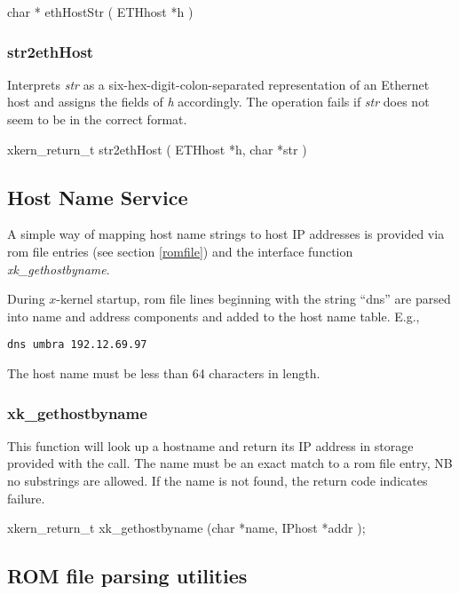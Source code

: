{\sem char *} {\bold ethHostStr} ( {\sem ETHhost} *{\caps h} )


\subsubsection{str2ethHost}

Interprets {\em str} as a six-hex-digit-colon-separated 
representation of an Ethernet host and assigns the fields of 
{\em h} accordingly.  The operation fails if {\em str} does not seem
to be in the correct format.
\medskip

{\sem xkern\_return\_t} {\bold str2ethHost} 
( {\sem ETHhost} *{\caps h}, {\sem char } *{\caps str} )


\subsection{Host Name Service}
\label{dns}
A simple way of mapping host name strings to host IP addresses is
provided via rom file entries (see section \ref{romfile}) and the interface
function {\em xk\_gethostbyname}.

During $x$-kernel startup, rom file lines beginning with
the string ``dns'' are parsed into name and address components
and added to the host name table.  E.g., 

\begin{verbatim}
dns umbra 192.12.69.97
\end{verbatim}

The host name must be less than 64 characters in length.

\subsubsection{xk\_gethostbyname}

This function will look up a hostname and return its IP address in
storage provided with the call.
The name must be an exact match to a rom file entry, NB no substrings
are allowed.  If the name is not found, the return code indicates
failure.
\medskip

{\sem xkern\_return\_t} {\bold xk\_gethostbyname} ({\sem char} *{\caps name}, 
{\sem IPhost} *{\caps addr} );



\subsection{ROM file parsing utilities}

